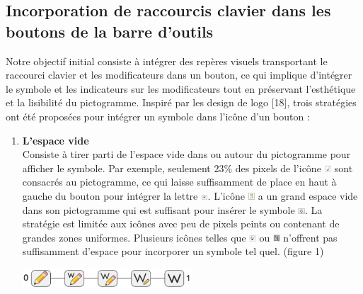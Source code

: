 \documentclass[12pt,a4paper]{article}
\begin{document}
\subsection{Incorporation de raccourcis clavier dans les boutons de la barre d’outils}
Notre objectif initial consiste à intégrer des repères visuels transportant le raccourci clavier et les modificateurs dans un bouton, ce qui implique d'intégrer le symbole et les indicateurs sur les
modificateurs tout en préservant l'esthétique et la lisibilité du pictogramme.
Inspiré par les design de logo [18], trois stratégies ont été proposées pour intégrer un symbole dans l'icône d'un bouton \cite{3} :
\begin{enumerate}
\item {\large \textbf{L’espace vide}}\\
Consiste à tirer parti de l'espace vide dans ou autour du pictogramme pour afficher le symbole. Par exemple, seulement 23\% des pixels de l’icône \includegraphics[width=0.02\textwidth]{i1.png} sont consacrés au pictogramme, ce qui laisse suffisamment de place en haut à gauche du bouton pour intégrer la lettre \includegraphics[width=0.02\textwidth]{i2.png}. L'icône \includegraphics[width=0.02\textwidth]{i3.png} a un grand
espace vide dans son pictogramme qui est suffisant pour insérer le symbole \includegraphics[width=0.02\textwidth]{i4.png}. La stratégie est limitée aux icônes avec peu de pixels peints ou contenant de grandes zones uniformes. Plusieurs icônes telles que \includegraphics[width=0.02\textwidth]{i5.png} ou \includegraphics[width=0.02\textwidth]{i6.png} n’offrent pas suffisamment d'espace pour incorporer un symbole tel quel.
(figure 1)
\begin{center}
	\includegraphics[width=0.5\textwidth]{T1.png}\\

\end{center}
\end{enumerate}
\end{document}
